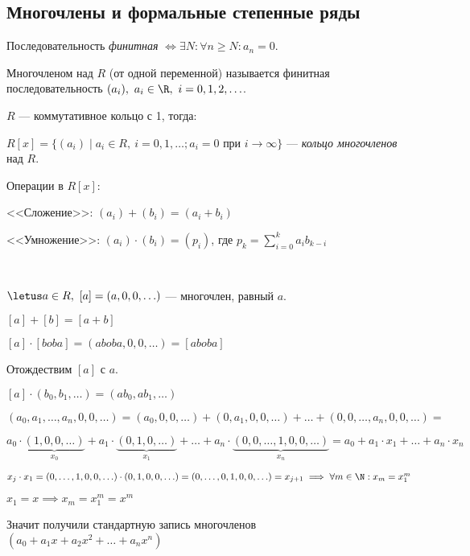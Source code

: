 \subsection{Многочлены и формальные степенные ряды}

\begin{defn}
    Последовательность \emph{финитная} $\iff \exists N: \forall n \geq N: a_n = 0$.
\end{defn}

\begin{defn}
    Многочленом над $R$ (от одной переменной) называется финитная последовательность $(a_i),~a_i \in \R,~i=0,1,2,\ldots$.
\end{defn}

\begin{defn}
    $R$ --- коммутативное кольцо с 1, тогда:
    
    $R[x] = \{(a_i) \mid a_i \in R,~ i = 0, 1, \ldots; a_i = 0$ при $i \to \infty \}$ --- \emph{кольцо многочленов} над $R$.
\end{defn}

\begin{theorem-non}
    Операции в $R[x]$:

    <<Сложение>>:
    $(a_i) + (b_i) = (a_i + b_i)$

    <<Умножение>>:
    $(a_i) \cdot (b_i) = (p_i)$, где $p_k = \sum\limits_{i=0}^k a_i b_{k-i}$
\end{theorem-non}

\begin{theorem-non}~

    $\letus a \in R,~[a] = (a, 0, 0, \ldots)$ --- многочлен, равный $a$.

    $[a] + [b] = [a + b]$
    
    $[a] \cdot [boba] = (aboba, 0, 0, \ldots) = [aboba]$
    
    Отождествим $[a]$ с $a$.
    
    $[a] \cdot (b_0, b_1, \ldots) = (ab_0, ab_1, \ldots)$
    
    $(a_0, a_1, \ldots, a_n, 0, 0, \ldots) = (a_0, 0, 0, \ldots) + (0, a_1, 0, 0, \ldots) + \ldots + (0, 0, \ldots, a_n, 0, 0, \ldots) =$ 
    
    $a_0 \cdot \underbrace{(1, 0, 0, \ldots)}_{x_0} + a_1 \cdot \underbrace{(0, 1, 0, \ldots)}_{x_1} + \ldots + a_n \cdot \underbrace{(0, 0, \ldots, 1, 0, 0, \ldots)}_{x_n} = a_0 + a_1 \cdot x_1 + \ldots + a_n \cdot x_n$
    
    $x_j \cdot x_1 = (0, \ldots, 1, 0, 0, \ldots) \cdot (0, 1, 0, 0, \ldots) = (0, \ldots, 0, 1, 0, 0, \ldots) = x_{j+1} \implies \forall m \in \N: x_m = x_1^m$
    
    $x_1 = x \implies x_m = x_1^m = x^m$
    
    Значит получили стандартную запись многочленов $(a_0 + a_1 x + a_2 x^2 + \ldots + a_n x^n)$
\end{theorem-non}

